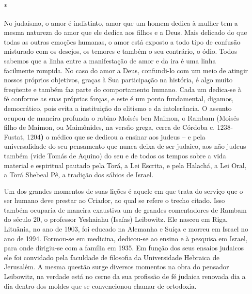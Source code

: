 *

No judaísmo, o amor é indistinto, amor que um homem dedica à mulher tem
a mesma natureza do amor que ele dedica aos filhos e a Deus. Mais
delicado do que todas as outras emoções humanas, o amor está exposto a
todo tipo de confusão misturado com os desejos, os temores e também o
seu contrário, o ódio. Todos sabemos que a linha entre a manifestação de
amor e da ira é uma linha facilmente rompida. No caso do amor a Deus,
confundi-lo com um meio de atingir nossos próprios objetivos, graças à
Sua participação na história, é algo muito freqüente e também faz parte
do comportamento humano. Cada um dedica-se à fé conforme as suas
próprias forças, e este é um ponto fundamental, digamos, democrático,
pois evita a instituição do elitismo e da intolerância. O assunto ocupou
de maneira profunda o rabino Moisés ben Maimon, o Rambam (Moisés filho
de Maimon, ou Maimônides, na versão grega, cerca de Córdoba c.
1238-Fustat, 1204\textbf{)} o médico que se dedicou a ensinar aos judeus
-- e pela universalidade do seu pensamento que nunca deixa de ser
judaico, aos não judeus também (vide Tomás de Aquino) do seu e de todos
os tempos sobre a vida material e espiritual pautado pela Torá, a Lei
Escrita, e pela Halachá, a Lei Oral, a Torá Shebeal Pê, a tradição dos
sábios de Israel.

Um dos grandes momentos de suas lições é aquele em que trata do serviço
que o ser humano deve prestar ao Criador, ao qual se refere o trecho
citado. Isso também ocuparia de maneira exaustiva um de grandes
comentadores de Rambam do século 20, o professor Yeshaiahu (Isaías)
Leibowitz. Ele nasceu em Riga, Lituânia, no ano de 1903, foi educado na
Alemanha e Suíça e morreu em Israel no ano de 1994. Formou-se em
medicina, dedicou-se ao ensino e à pesquisa em Israel, para onde
dirigiu-se com a família em 1935. Em função dos seus ensaios judaicos
ele foi convidado pela faculdade de filosofia da Universidade Hebraica
de Jerusalém. A mesma questão surge diversos momentos na obra do
pensador Leibowitz, na verdade está no cerne da sua profissão de fé
judaica renovada dia a dia dentro dos moldes que se convencionou chamar
de ortodoxia.

